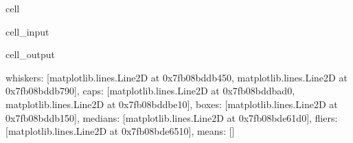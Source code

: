 \documentclass[letterpaper,10pt,english]{jupyterBook}
\begin{document}
\begin{sphinxuseclass}{cell}\begin{sphinxVerbatimInput}

\begin{sphinxuseclass}{cell_input}
\begin{sphinxVerbatim}[commandchars=\\\{\}]
 \PYG{p}{[} \PYG{p}{]}   
   
\PYG{p}{[}\PYG{p}{]} 
\end{sphinxVerbatim}

\end{sphinxuseclass}\end{sphinxVerbatimInput}
\begin{sphinxVerbatimOutput}

\begin{sphinxuseclass}{cell_output}
\begin{sphinxVerbatim}[commandchars=\\\{\}]
\PYGZob{}\PYGZsq{}whiskers\PYGZsq{}: [\PYGZlt{}matplotlib.lines.Line2D at 0x7fb08bddb450\PYGZgt{},
  \PYGZlt{}matplotlib.lines.Line2D at 0x7fb08bddb790\PYGZgt{}],
 \PYGZsq{}caps\PYGZsq{}: [\PYGZlt{}matplotlib.lines.Line2D at 0x7fb08bddbad0\PYGZgt{},
  \PYGZlt{}matplotlib.lines.Line2D at 0x7fb08bddbe10\PYGZgt{}],
 \PYGZsq{}boxes\PYGZsq{}: [\PYGZlt{}matplotlib.lines.Line2D at 0x7fb08bddb150\PYGZgt{}],
 \PYGZsq{}medians\PYGZsq{}: [\PYGZlt{}matplotlib.lines.Line2D at 0x7fb08bde61d0\PYGZgt{}],
 \PYGZsq{}fliers\PYGZsq{}: [\PYGZlt{}matplotlib.lines.Line2D at 0x7fb08bde6510\PYGZgt{}],
 \PYGZsq{}means\PYGZsq{}: []\PYGZcb{}
\end{sphinxVerbatim}

\noindent{}

\end{sphinxuseclass}\end{sphinxVerbatimOutput}

\end{sphinxuseclass}
\end{document}
